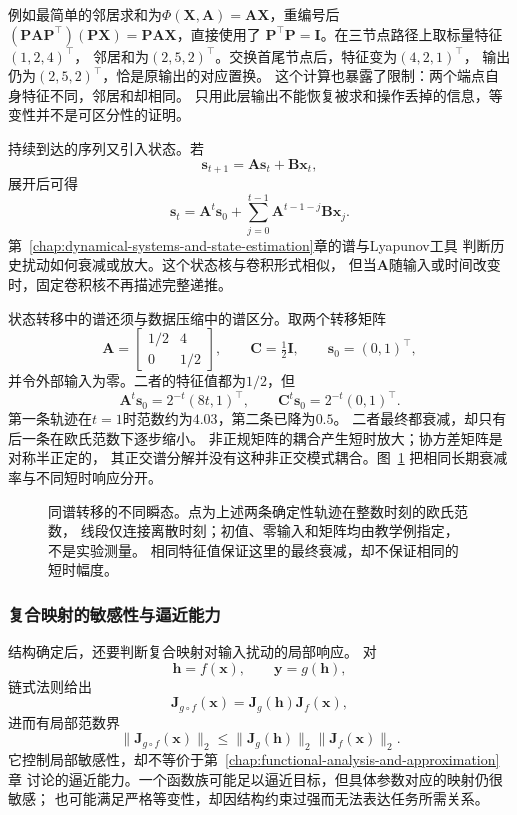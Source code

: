 例如最简单的邻居求和为$\Phi(\bm X,\bm A)=\bm A\bm X$，重编号后
$(\bm P\bm A\bm P^\top)(\bm P\bm X)=\bm P\bm A\bm X$，直接使用了
$\bm P^\top\bm P=\bm I$。在三节点路径上取标量特征$(1,2,4)^\top$，
邻居和为$(2,5,2)^\top$。交换首尾节点后，特征变为$(4,2,1)^\top$，
输出仍为$(2,5,2)^\top$，恰是原输出的对应置换。
这个计算也暴露了限制：两个端点自身特征不同，邻居和却相同。
只用此层输出不能恢复被求和操作丢掉的信息，等变性并不是可区分性的证明。

持续到达的序列又引入状态。若
\[
  \bm{s}_{t+1}
  =
  \bm{A}\bm{s}_t+\bm{B}\bm{x}_t,
\]
展开后可得
\[
  \bm{s}_{t}
  =
  \bm{A}^{t}\bm{s}_0
  +
  \sum_{j=0}^{t-1}
  \bm{A}^{t-1-j}\bm{B}\bm{x}_j.
\]
第~\ref{chap:dynamical-systems-and-state-estimation}章的谱与Lyapunov工具
判断历史扰动如何衰减或放大。这个状态核与卷积形式相似，
但当$\bm{A}$随输入或时间改变时，固定卷积核不再描述完整递推。

状态转移中的谱还须与数据压缩中的谱区分。取两个转移矩阵
\[
  \bm A=\begin{bmatrix}1/2&4\\0&1/2\end{bmatrix},
  \qquad
  \bm C=\tfrac12\bm I,
  \qquad
  \bm s_0=(0,1)^\top,
\]
并令外部输入为零。二者的特征值都为$1/2$，但
\[
  \bm A^t\bm s_0=2^{-t}(8t,1)^\top,
  \qquad
  \bm C^t\bm s_0=2^{-t}(0,1)^\top.
\]
第一条轨迹在$t=1$时范数约为$4.03$，第二条已降为$0.5$。
二者最终都衰减，却只有后一条在欧氏范数下逐步缩小。
非正规矩阵的耦合产生短时放大；协方差矩阵是对称半正定的，
其正交谱分解并没有这种非正交模式耦合。图~\ref{fig:future-same-spectrum-transients}
把相同长期衰减率与不同短时响应分开。

\begin{figure}[htbp]
  \centering
  
  \caption{同谱转移的不同瞬态。点为上述两条确定性轨迹在整数时刻的欧氏范数，
  线段仅连接离散时刻；初值、零输入和矩阵均由教学例指定，不是实验测量。
  相同特征值保证这里的最终衰减，却不保证相同的短时幅度。}
  \label{fig:future-same-spectrum-transients}
\end{figure}

\subsubsection{复合映射的敏感性与逼近能力}
\label{sec:future-composition-sensitivity-approximation}

结构确定后，还要判断复合映射对输入扰动的局部响应。
对
\[
  \bm{h}=f(\bm{x}),
  \qquad
  \bm{y}=g(\bm{h}),
\]
链式法则给出
\[
  \bm{J}_{g\circ f}(\bm{x})
  =
  \bm{J}_{g}(\bm{h})\bm{J}_{f}(\bm{x}),
\]
进而有局部范数界
\[
  \lVert\bm{J}_{g\circ f}(\bm{x})\rVert_2
  \leq
  \lVert\bm{J}_{g}(\bm{h})\rVert_2
  \lVert\bm{J}_{f}(\bm{x})\rVert_2.
\]
它控制局部敏感性，却不等价于第~\ref{chap:functional-analysis-and-approximation}章
讨论的逼近能力。一个函数族可能足以逼近目标，但具体参数对应的映射仍很敏感；
也可能满足严格等变性，却因结构约束过强而无法表达任务所需关系。

